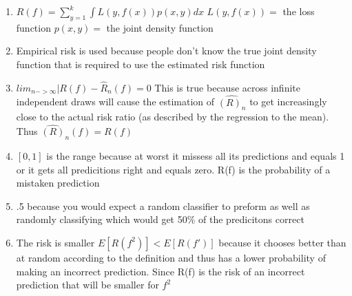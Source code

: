 \documentclass{article}
\begin{document}
\begin{enumerate}
\begin{enumerate}
			\item $R(f) = \sum_{y=1}^{k}\int L(y,f(x))p(x,y)dx$ \newline
			$L(y,f(x)) =$ the loss function
			$p(x,y) =$ the joint density function
			
			\item Empirical risk is used because people don't know the true joint density function that is required to use the estimated risk function
			
			\item $lim_{n->\infty}|R(f)- \hat{R}_{n}{(f)}=0$ \newline This is true because across infinite independent draws will cause the estimation of $\hat{(R)_{n}}$ to get increasingly close to the actual risk ratio (as described by the regression to the mean). Thus $\hat{(R)}_{n}(f)=R(f)$
			
			\item $[0,1]$ is the range because at worst it missess all its predictions and equals 1 or it gets all predicitions right and equals zero. R(f) is the probability of a mistaken prediction
			
			\item .5 because you would expect a random classifier to preform as well as randomly classifying which would get 50\% of the predicitons correct
			
			\item The risk is smaller $E[R(f^{2})]<E[R(f')]$ because it chooses better than at random according to the definition and thus has a lower probability of making an incorrect prediction. Since R(f) is the risk of an incorrect prediction that will be smaller for $f^{2}$
		\end{enumerate}
		
	\end{enumerate}
	
\end{document}
